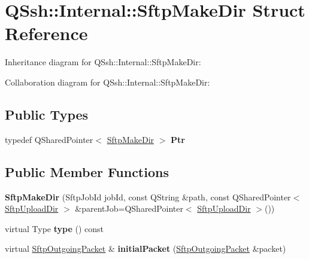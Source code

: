 \hypertarget{struct_q_ssh_1_1_internal_1_1_sftp_make_dir}{}\section{Q\+Ssh\+:\+:Internal\+:\+:Sftp\+Make\+Dir Struct Reference}
\label{struct_q_ssh_1_1_internal_1_1_sftp_make_dir}


Inheritance diagram for Q\+Ssh\+:\+:Internal\+:\+:Sftp\+Make\+Dir\+:


Collaboration diagram for Q\+Ssh\+:\+:Internal\+:\+:Sftp\+Make\+Dir\+:
\subsection*{Public Types}
\begin{DoxyCompactItemize}
\item 
\mbox{\label{struct_q_ssh_1_1_internal_1_1_sftp_make_dir_a8ae9070de030ca8646bec3b8af6fda29}} 
typedef Q\+Shared\+Pointer$<$ \mbox{\hyperlink{struct_q_ssh_1_1_internal_1_1_sftp_make_dir}{Sftp\+Make\+Dir}} $>$ {\bfseries Ptr}
\end{DoxyCompactItemize}
\subsection*{Public Member Functions}
\begin{DoxyCompactItemize}
\item 
\mbox{\label{struct_q_ssh_1_1_internal_1_1_sftp_make_dir_a94ee6436dd0ad3e21bf71d44d32bf646}} 
{\bfseries Sftp\+Make\+Dir} (Sftp\+Job\+Id job\+Id, const Q\+String \&path, const Q\+Shared\+Pointer$<$ \mbox{\hyperlink{struct_q_ssh_1_1_internal_1_1_sftp_upload_dir}{Sftp\+Upload\+Dir}} $>$ \&parent\+Job=Q\+Shared\+Pointer$<$ \mbox{\hyperlink{struct_q_ssh_1_1_internal_1_1_sftp_upload_dir}{Sftp\+Upload\+Dir}} $>$())
\item 
\mbox{\label{struct_q_ssh_1_1_internal_1_1_sftp_make_dir_aebdc775dd6baba55cfa1d6ca7fc3c26f}} 
virtual Type {\bfseries type} () const
\item 
\mbox{\label{struct_q_ssh_1_1_internal_1_1_sftp_make_dir_a748848386bfaa0033c7148532f15f85b}} 
virtual \mbox{\hyperlink{class_q_ssh_1_1_internal_1_1_sftp_outgoing_packet}{Sftp\+Outgoing\+Packet}} \& {\bfseries initial\+Packet} (\mbox{\hyperlink{class_q_ssh_1_1_internal_1_1_sftp_outgoing_packet}{Sftp\+Outgoing\+Packet}} \&packet)
\end{DoxyCompactItemize}
